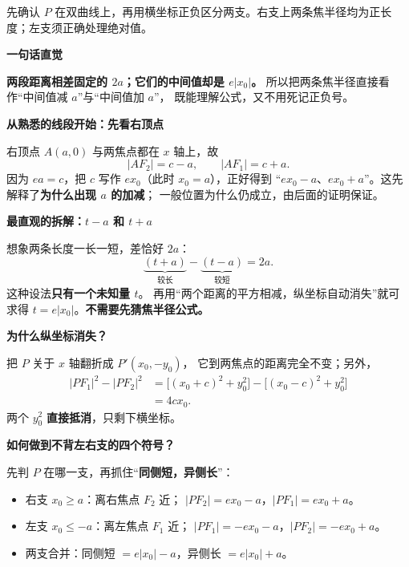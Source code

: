 \begin{explanationbox}
\begin{minipage}{\linewidth}
\begin{center}\end{center}
先确认 $P$ 在双曲线上，再用横坐标正负区分两支。右支上两条焦半径均为正长度；左支须正确处理绝对值。
\end{minipage}
\par\medskip

\textbf{\textcolor{CExplanation}{一句话直觉}}

\textbf{两段距离相差固定的 $2a$；它们的中间值却是 $e|x_0|$。}
所以把两条焦半径直接看作“中间值减 $a$”与“中间值加 $a$”，
既能理解公式，又不用死记正负号。

\medskip
\textbf{\textcolor{CExplanation}{从熟悉的线段开始：先看右顶点}}

右顶点 $A(a,0)$ 与两焦点都在 $x$ 轴上，故
\[
 |AF_2|=c-a,\qquad |AF_1|=c+a.
\]
因为 $ea=c$，把 $c$ 写作 $ex_0$（此时 $x_0=a$），正好得到
“$ex_0-a$、$ex_0+a$”。这先解释了\textbf{为什么出现 $a$ 的加减}；
一般位置为什么仍成立，由后面的证明保证。

\medskip
\textbf{\textcolor{CExplanation}{最直观的拆解：$t-a$ 和 $t+a$}}

想象两条长度一长一短，差恰好 $2a$：
\[
 \underbrace{(t+a)}_{\text{较长}}-
 \underbrace{(t-a)}_{\text{较短}}=2a.
\]
这种设法\textbf{只有一个未知量 $t$}。
再用“两个距离的平方相减，纵坐标自动消失”就可求得
$t=e|x_0|$。\textbf{不需要先猜焦半径公式。}

\medskip
\textbf{\textcolor{CExplanation}{为什么纵坐标消失？}}

把 $P$ 关于 $x$ 轴翻折成 $P'(x_0,-y_0)$，
它到两焦点的距离完全不变；另外，
\[
 \begin{aligned}
 |PF_1|^2-|PF_2|^2
 &=\bigl[(x_0+c)^2+y_0^2\bigr]
   -\bigl[(x_0-c)^2+y_0^2\bigr]\\
 &=4cx_0.
 \end{aligned}
\]
两个 $y_0^2$ \textbf{直接抵消}，只剩下横坐标。

\medskip
\textbf{\textcolor{CExplanation}{如何做到不背左右支的四个符号？}}

先判 $P$ 在哪一支，再抓住“\textbf{同侧短，异侧长}”：
\begin{itemize}[leftmargin=*,itemsep=0.35em,topsep=0.35em]
 \item 右支 $x_0\ge a$：离右焦点 $F_2$ 近；
 $|PF_2|=ex_0-a$，$|PF_1|=ex_0+a$。
 \item 左支 $x_0\le-a$：离左焦点 $F_1$ 近；
 $|PF_1|=-ex_0-a$，$|PF_2|=-ex_0+a$。
 \item 两支合并：同侧短 $=e|x_0|-a$，异侧长 $=e|x_0|+a$。
\end{itemize}


\end{explanationbox}
